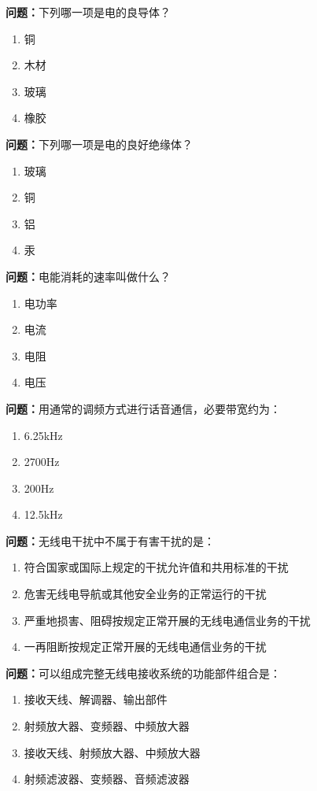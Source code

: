 \documentclass{ctexbook}
\begin{document}
\textbf{问题：}下列哪一项是电的良导体？
\begin{enumerate}[label=\Alph*), leftmargin=3em]
\item 铜
\item 木材
\item 玻璃
\item 橡胶
\end{enumerate}

\textbf{问题：}下列哪一项是电的良好绝缘体？
\begin{enumerate}[label=\Alph*), leftmargin=3em]
\item 玻璃
\item 铜
\item 铝
\item 汞
\end{enumerate}

\textbf{问题：}电能消耗的速率叫做什么？
\begin{enumerate}[label=\Alph*), leftmargin=3em]
\item 电功率
\item 电流
\item 电阻
\item 电压
\end{enumerate}

\textbf{问题：}用通常的调频方式进行话音通信，必要带宽约为：
\begin{enumerate}[label=\Alph*), leftmargin=3em]
\item 6.25kHz
\item 2700Hz
\item 200Hz
\item 12.5kHz
\end{enumerate}

\textbf{问题：}无线电干扰中不属于有害干扰的是：
\begin{enumerate}[label=\Alph*), leftmargin=3em]
\item 符合国家或国际上规定的干扰允许值和共用标准的干扰
\item 危害无线电导航或其他安全业务的正常运行的干扰
\item 严重地损害、阻碍按规定正常开展的无线电通信业务的干扰
\item 一再阻断按规定正常开展的无线电通信业务的干扰
\end{enumerate}

\textbf{问题：}可以组成完整无线电接收系统的功能部件组合是：
\begin{enumerate}[label=\Alph*), leftmargin=3em]
\item 接收天线、解调器、输出部件
\item 射频放大器、变频器、中频放大器
\item 接收天线、射频放大器、中频放大器
\item 射频滤波器、变频器、音频滤波器
\end{enumerate}
\end{document}
